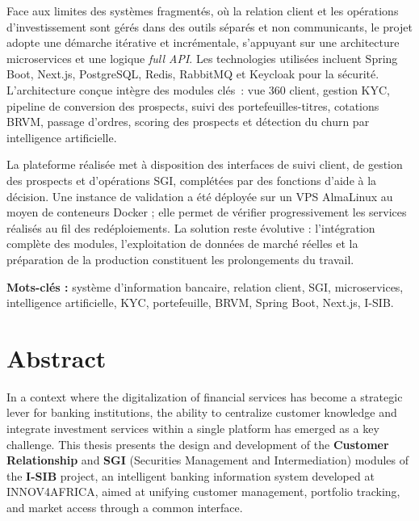 \documentclass[a4paper,12pt]{report}
\begin{document}
\hspace{0.5cm}
Face aux limites des systèmes fragmentés, où la relation client et les opérations
d'investissement sont gérés dans des outils séparés et non communicants, le projet
adopte une démarche itérative et incrémentale, s'appuyant sur une architecture
microservices et une logique \textit{full API}. Les technologies utilisées incluent
Spring Boot, Next.js, PostgreSQL, Redis, RabbitMQ et Keycloak pour la sécurité.
L'architecture conçue intègre des modules clés~: vue 360 client, gestion KYC,
pipeline de conversion des prospects, suivi des portefeuilles-titres, cotations
BRVM, passage d'ordres, scoring des prospects et détection du churn par
intelligence artificielle.

\hspace{0.5cm}
La plateforme réalisée met à disposition des interfaces de suivi client, de
gestion des prospects et d'opérations SGI, complétées par des fonctions d'aide
à la décision. Une instance de validation a été déployée sur un VPS AlmaLinux
au moyen de conteneurs Docker ; elle permet de vérifier progressivement les
services réalisés au fil des redéploiements. La solution reste évolutive :
l'intégration complète des modules, l'exploitation de données de marché réelles
et la préparation de la production constituent les prolongements du travail.

\vspace{0.8cm}
\noindent
\textbf{Mots-clés :} système d'information bancaire, relation client, SGI,
microservices, intelligence artificielle, KYC, portefeuille, BRVM, Spring Boot,
Next.js, I-SIB.

\cleardoublepage

\chapter*{Abstract}
{}

\hspace{0.5cm}
In a context where the digitalization of financial services has become a strategic
lever for banking institutions, the ability to centralize customer knowledge and
integrate investment services within a single platform has emerged as a key
challenge. This thesis presents the design and development of the
\textbf{Customer Relationship} and \textbf{SGI} (Securities Management and
Intermediation) modules of the \textbf{I-SIB} project, an intelligent banking
information system developed at INNOV4AFRICA, aimed at unifying customer
management, portfolio tracking, and market access through a common interface.
\end{document}
